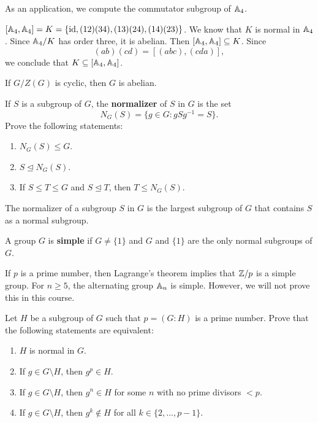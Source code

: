 As an application, 
we compute the commutator subgroup of $\mathbb{A}_4$. 

\begin{example}
$[\mathbb{A}_4,\mathbb{A}_4]=K=\{\operatorname{id},(12)(34),(13)(24),(14)(23)\}$.
We know that $K$ is normal in $\mathbb{A}_4$. Since $\mathbb{A}_4/K$ has order three, 
it is abelian. Then $[\mathbb{A}_4,\mathbb{A}_4]\subseteq K$. Since 
\[
(ab)(cd)=[(abc),(cda)],
\]
we conclude that $K\subseteq[\mathbb{A}_4,\mathbb{A}_4]$.
\end{example}

\begin{exercise}
\label{xca:G/Z(G)}
If $G/Z(G)$ is cyclic, then $G$ is abelian.
\end{exercise}

\begin{exercise}
\label{xca:normalizer}
If $S$ is a subgroup of $G$, the \textbf{normalizer} of $S$ in $G$
is the set  
\[
N_G(S)=\{g\in G:gSg^{-1}=S\}.
\]
Prove the following statements:
\begin{enumerate}
\item $N_G(S)\leq G$. 
\item $S\unlhd N_G(S)$.
\item If $S\leq T\leq G$ and $S\unlhd T$, then $T\leq N_G(S)$.
\end{enumerate}
\end{exercise}

The normalizer of a subgroup  $S$ in $G$ is the largest 
subgroup of $G$ that contains $S$ as a normal subgroup. 

\begin{definition}
A group $G$ is \textbf{simple} if $G\ne\{1\}$ and 
$G$ and $\{1\}$ are the only normal subgroups of $G$. 
\end{definition}

If $p$ is a prime number, then Lagrange's theorem implies that 
$\mathbb{Z}/p$ is a simple group. 
For $n\geq5$, the alternating group $\mathbb{A}_n$ is simple. However, 
we will not
prove this in this course. 

\begin{exercise}
\label{xca:index_p}
Let $H$ be a subgroup of $G$ such that $p=(G:H)$ is a prime number. 
Prove that the following statements are equivalent:
\begin{enumerate}
\item $H$ is normal in $G$.
\item If $g\in G\setminus H$, then $g^p\in H$.
\item If $g\in G\setminus H$, then $g^n\in H$ for some $n$ with no prime divisors $<p$.
\item If $g\in G\setminus H$, then $g^k\not\in H$ for all $k\in\{2,\dots,p-1\}$.
\end{enumerate}
\end{exercise}

